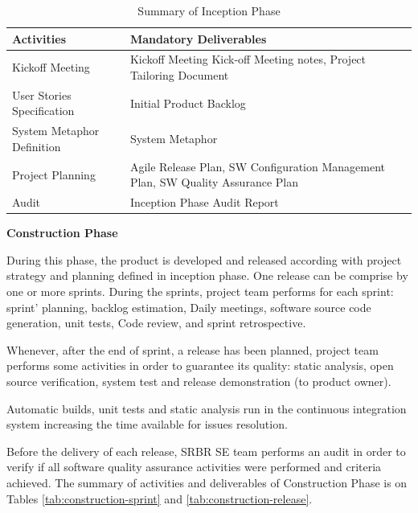 \begin{table}[h]
  \caption{Summary of Inception Phase}
  \label{tab:inception}
  \begin{tabular}{p{2.5cm}p{5.5cm}}
    \toprule
    Activities&Mandatory Deliverables\\
    \midrule
    Kickoff Meeting & Kickoff Meeting	Kick-off Meeting notes, Project Tailoring Document\\
    User Stories Specification & Initial Product Backlog\\
    System Metaphor Definition & System Metaphor\\
    Project Planning & Agile Release Plan, SW Configuration Management Plan, SW Quality Assurance Plan\\
    Audit & Inception Phase Audit Report\\
  \bottomrule
\end{tabular}
\end{table}

\textbf{Construction Phase}

During this phase, the product is developed and released according with project strategy and planning defined in inception phase. One release can be comprise by one or more sprints. During the sprints, project team performs for each sprint: sprint' planning, backlog estimation, Daily meetings, software source code generation, unit tests, Code review, and sprint retrospective.

Whenever, after the end of sprint, a release has been planned, project team performs some activities in order to guarantee its quality: static analysis, open source verification, system test and release demonstration (to product owner).

Automatic builds, unit tests and static analysis run in the continuous integration system increasing the time available for issues resolution.

Before the delivery of each release, SRBR SE team performs an audit in order to verify if all software quality assurance activities were performed and criteria achieved. The summary of activities and deliverables of Construction Phase is on Tables \ref{tab:construction-sprint} and \ref{tab:construction-release}.

